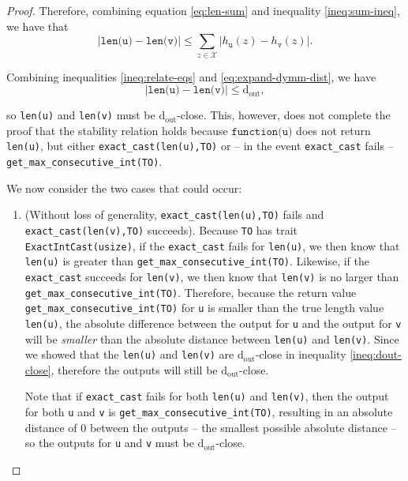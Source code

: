 \documentclass[12pt,letterpaper]{article}
\newcommand{\dout}{\mathrm{d_{out}}}
\theoremstyle{definition}
\begin{document}
\begin{proof}
Therefore, combining equation \ref{eq:len-sum} and inequality \ref{ineq:sum-ineq}, we have that
\begin{equation}
\label{ineq:relate-eqs}
    |\texttt{len(u)} - \texttt{len(v)}|
    \leq 
    \sum_{z\in \mathcal{X}}|h_{\texttt{u}}(z) - h_{\texttt{v}}(z)|.
\end{equation}

Combining inequalities \ref{ineq:relate-eqs} and \ref{eq:expand-dymm-dist}, we have
\begin{equation}
\label{ineq:dout-close}
    |\texttt{len(u)} - \texttt{len(v)}|
    \leq
    \dout,
\end{equation}

so \texttt{len(u)} and \texttt{len(v)} must be $\dout$-close. This, however, does not complete the proof that the stability relation holds because $\texttt{function(u)}$ does not return \texttt{len(u)}, but either \texttt{exact\_cast(len(u),TO)} or -- in the event \texttt{exact\_cast} fails -- \texttt{get\_max\_consecutive\_int(TO)}.

We now consider the two cases that could occur:

\begin{enumerate}
    \item (Without loss of generality, \texttt{exact\_cast(len(u),TO)} fails and \texttt{exact\_cast(len(v),TO)} succeeds). Because \texttt{TO} has trait \texttt{ExactIntCast(usize)}, if the \texttt{exact\_cast} fails for \texttt{len(u)}, we then know that \texttt{len(u)} is greater than \texttt{get\_max\_consecutive\_int(TO)}. Likewise, if the \texttt{exact\_cast} succeeds for \texttt{len(v)}, we then know that \texttt{len(v)} is no larger than \texttt{get\_max\_consecutive\_int(TO)}. Therefore, because the return value  \texttt{get\_max\_consecutive\_int(TO)} for \texttt{u} is smaller than the true length value \texttt{len(u)}, the absolute difference between the output for \texttt{u} and the output for \texttt{v} will be \emph{smaller} than the absolute distance between \texttt{len(u)} and \texttt{len(v)}. Since we showed that the \texttt{len(u)} and \texttt{len(v)} are $\dout$-close in inequality \ref{ineq:dout-close}, therefore the outputs will still be $\dout$-close.
    
    Note that if \texttt{exact\_cast} fails for both \texttt{len(u)} and \texttt{len(v)}, then the output for both \texttt{u} and \texttt{v} is \texttt{get\_max\_consecutive\_int(TO)}, resulting in an absolute distance of 0 between the outputs -- the smallest possible absolute distance -- so the outputs for \texttt{u} and \texttt{v} must be $\dout$-close.
    

\end{enumerate}
\end{proof}
\end{document}
